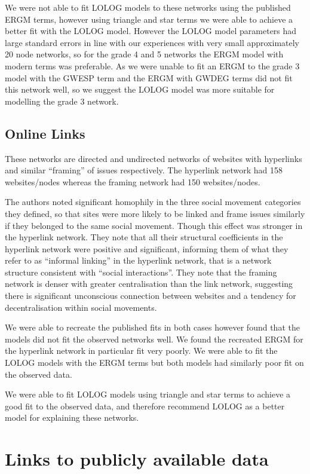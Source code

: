 \documentclass[
]{statsoc}
\begin{document}
We were not able to fit LOLOG models to these networks using the
published ERGM terms, however using triangle and star terms we were able
to achieve a better fit with the LOLOG model. However the LOLOG model
parameters had large standard errors in line with our experiences with
very small approximately 20 node networks, so for the grade 4 and 5
networks the ERGM model with modern terms was preferable. As we were
unable to fit an ERGM to the grade 3 model with the GWESP term and the
ERGM with GWDEG terms did not fit this network well, so we suggest the
LOLOG model was more suitable for modelling the grade 3 network.

\subsection{Online Links}

These networks are directed and undirected networks of websites with
hyperlinks and similar ``framing'' of issues respectively. The hyperlink
network had 158 websites/nodes whereas the framing network had 150
websites/nodes.

The authors noted significant homophily in the three social movement
categories they defined, so that sites were more likely to be linked and
frame issues similarly if they belonged to the same social movement.
Though this effect was stronger in the hyperlink network. They note that
all their structural coefficients in the hyperlink network were positive
and significant, informing them of what they refer to as ``informal
linking'' in the hyperlink network, that is a network structure
consistent with ``social interactions''. They note that the framing
network is denser with greater centralisation than the link network,
suggesting there is significant unconscious connection between websites
and a tendency for decentralisation within social movements.

We were able to recreate the published fits in both cases however found
that the models did not fit the observed networks well. We found the
recreated ERGM for the hyperlink network in particular fit very poorly.
We were able to fit the LOLOG models with the ERGM terms but both models
had similarly poor fit on the observed data.

We were able to fit LOLOG models using triangle and star terms to
achieve a good fit to the observed data, and therefore recommend LOLOG
as a better model for explaining these networks.

\section{Links to publicly available data}
\end{document}
